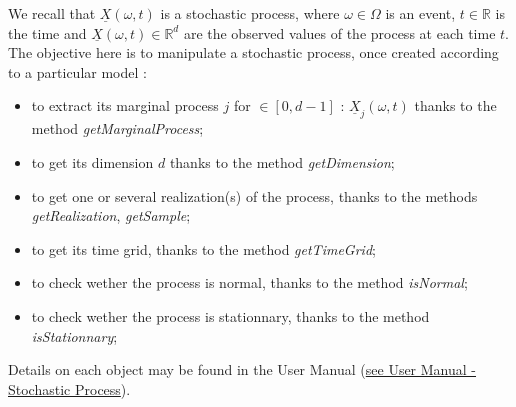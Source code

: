\renewcommand{\filename}{docUC_StocProc_Process.tex}
\renewcommand{\filetitle}{UC : Manipulation of a process}

 \HeaderIILevel

\label{UCprocess}




We recall that  $\underline{X}(\omega,t)$ is a stochastic process, where $\omega \in \Omega$ is an event, $t \in \mathbb{R}$ is the time and $\underline{X}(\omega,t) \in \mathbb{R}^d$ are the observed values of the process at each time $t$.\\

The objective here is to manipulate a stochastic process, once created according to a particular model : 
\begin {itemize}
  \item to extract its marginal process $j$ for $ \in [0,d-1]$ : $\underline{X}_j(\omega,t)$ thanks to the method \emph{getMarginalProcess};
  \item to get its dimension $d$  thanks to the method \emph{getDimension};
  \item to get one or several realization(s) of the process, thanks to the methods \emph{getRealization}, \emph{getSample};
  \item to get its time grid, thanks to the method \emph{getTimeGrid};
  \item to check wether the process is normal, thanks to the method \emph{isNormal};
  \item to check wether the process is stationnary, thanks to the method \emph{isStationnary};
\end{itemize}

Details on each object may be found in the User Manual  (\href{OpenTURNS_UserManual_TUI.pdf}{see User Manual - Stochastic Process}).\\

